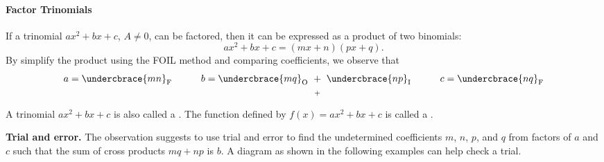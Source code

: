 
\paragraph*{Factor Trinomials}
	If a trinomial $ax^2+bx+c$, $A\neq 0$, can be factored, then it can be expressed as a product of two binomials: 
	\[ax^2+bx+c=(mx+n)(px+q).\]
	By simplify the product using the FOIL method and comparing coefficients, we observe that 
	\[
		a=\undercbrace{mn}_{\mathrm{F}}\quad\quad\quad 
		b=\undercbrace{mq}_{\mathrm{O}}~\underset{+}{\underset{}{+}}~\undercbrace{np}_{\mathrm{I}}
		\quad\quad\quad 
		c=\undercbrace{nq}_{\mathrm{F}}
	\]

	A trinomial $ax^2+bx+c$ is also called a . The function defined by $f(x)=ax^2+bx+c$ is called a .

	\begin{trick} \textbf{Trial and error.}
		The observation suggests to use trial and error to find the undetermined coefficients $m$, $n$, $p$, and $q$ from factors of $a$ and $c$ such that the sum of cross products $mq+np$ is $b$. A diagram as shown in the following examples can help check a trial.
	\end{trick}


